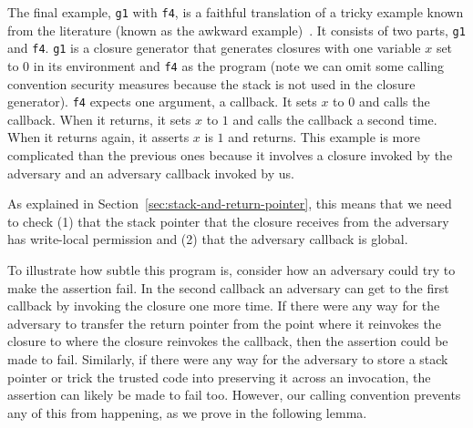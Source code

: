 \documentclass[format=acmsmall, review=true, screen=true]{acmart}
\renewcommand{\sectionname}{Section}
\newcommand{\itoplassug}[1]{}
\begin{document}
The final example, \texttt{g1} with \texttt{f4},
is a faithful translation of a tricky example known from the literature (known
as the awkward example)~\citep{pitts_operational_1998,Dreyer:jfp12}. It consists
of two parts, \texttt{g1} and \texttt{f4}.
\texttt{g1} is a closure generator that generates closures with
one variable $x$ set to $0$ in its environment and \texttt{f4} as
the program (note we can omit some calling convention security measures because
the stack is not used in the closure generator). \texttt{f4}
expects one argument, a callback. It sets $x$ to $0$ and calls the callback.
When it returns, it sets $x$ to $1$ and calls the callback a second time. When
it returns again, it asserts $x$ is $1$ and returns. This example is more
complicated than the previous ones because it involves a closure invoked by the
adversary and an adversary callback invoked by us.
\itoplassug{
  Suggestion: Maybe give some more intuition as to why it is difficult.
}
As explained in
\sectionname~\ref{sec:stack-and-return-pointer}, this means that we need to check (1)
that the stack pointer that the closure receives from the adversary has
write-local permission and (2) that the adversary callback is global.

To illustrate how subtle this program is, consider how an adversary could try to
make the assertion fail. In the second callback an adversary can get to the
first callback by invoking the closure one more time. If there were any way for
the adversary to transfer the return pointer from the point where it reinvokes
the closure to where the closure reinvokes the callback, then the assertion
could be made to fail. Similarly, if there were any way for the adversary to
store a stack pointer or trick the trusted code into preserving it across an
invocation, the assertion can likely be made to fail too. However, our calling
convention prevents any of this from happening, as we prove in the following
lemma.
\end{document}
